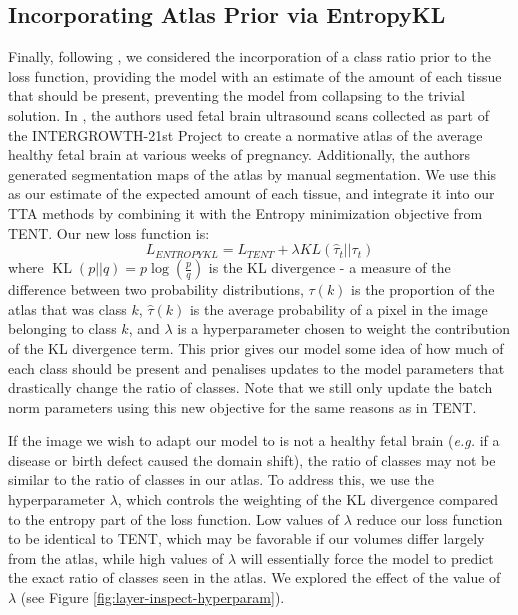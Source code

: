 \documentclass[conference]{IEEEtran}
\begin{document}
\subsection{Incorporating Atlas Prior via EntropyKL}
Finally, following \cite{Bateson2022}, we considered the incorporation of a class ratio prior to the loss function, providing the model with an estimate of the amount of each tissue that should be present, preventing the model from collapsing to the trivial solution. In \cite{Namburete2023}, the authors used fetal brain ultrasound scans collected as part of the INTERGROWTH-21st Project \cite{papageorghiou2018intergrowth} to create a normative atlas of the average healthy fetal brain at various weeks of pregnancy. Additionally, the authors generated segmentation maps of the atlas by manual segmentation. We use this as our estimate of the expected amount of each tissue, and integrate it into our TTA methods by combining it with the Entropy minimization objective from TENT. Our new loss function is:
\begin{equation}
    L_{ENTROPYKL} = L_{TENT} + \lambda KL(\hat{\tau}_t || \tau_t)
\end{equation}
where $\operatorname{KL}(p || q) = p \log \left( \frac{p}{q} \right)$ is the KL divergence - a measure of the difference between two probability distributions, $\tau(k)$ is the proportion of the atlas that was class $k$, $\hat{\tau}(k)$ is the average probability of a pixel in the image belonging to class $k$, and $\lambda$ is a hyperparameter chosen to weight the contribution of the KL divergence term. This prior gives our model some idea of how much of each class should be present and penalises updates to the model parameters that drastically change the ratio of classes. Note that we still only update the batch norm parameters using this new objective for the same reasons as in TENT.

If the image we wish to adapt our model to is not a healthy fetal brain (\textit{e.g.} if a disease or birth defect caused the domain shift), the ratio of classes may not be similar to the ratio of classes in our atlas. To address this, we use the hyperparameter $\lambda$, which controls the weighting of the KL divergence compared to the entropy part of the loss function. Low values of $\lambda$ reduce our loss function to be identical to TENT, which may be favorable if our volumes differ largely from the atlas, while high values of $\lambda$ will essentially force the model to predict the exact ratio of classes seen in the atlas. We explored the effect of the value of $\lambda$ (see Figure \ref{fig:layer-inspect-hyperparam}).
\end{document}
